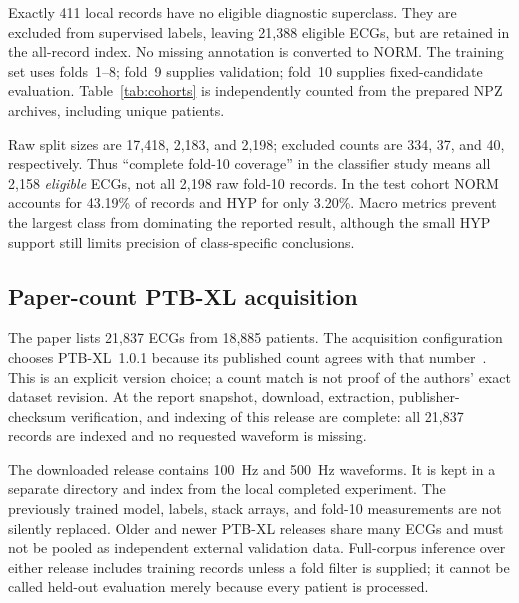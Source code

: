 \documentclass[11pt,a4paper]{article}
\begin{document}
Exactly 411 local records have no eligible diagnostic superclass. They are excluded from supervised labels, leaving 21,388 eligible ECGs, but are retained in the all-record index. No missing annotation is converted to NORM. The training set uses folds~1--8; fold~9 supplies validation; fold~10 supplies fixed-candidate evaluation. Table~\ref{tab:cohorts} is independently counted from the prepared NPZ archives, including unique patients.

\begin{table}[htbp]\centering\small

\caption{Prepared supervised cohorts. Counts are ECGs unless explicitly labeled patients. No patient or record overlaps between these three splits were found.}
\label{tab:cohorts}\end{table}

Raw split sizes are 17,418, 2,183, and 2,198; excluded counts are 334, 37, and 40, respectively. Thus ``complete fold-10 coverage'' in the classifier study means all 2,158 \emph{eligible} ECGs, not all 2,198 raw fold-10 records. In the test cohort NORM accounts for 43.19\% of records and HYP for only 3.20\%. Macro metrics prevent the largest class from dominating the reported result, although the small HYP support still limits precision of class-specific conclusions.

\subsection{Paper-count PTB-XL acquisition}
The paper lists 21,837 ECGs from 18,885 patients. The acquisition configuration chooses PTB-XL~1.0.1 because its published count agrees with that number~\cite{ptbxl_old}. This is an explicit version choice; a count match is not proof of the authors' exact dataset revision. At the report snapshot, download, extraction, publisher-checksum verification, and indexing of this release are complete: all 21,837 records are indexed and no requested waveform is missing.

The downloaded release contains 100~Hz and 500~Hz waveforms. It is kept in a separate directory and index from the local completed experiment. The previously trained model, labels, stack arrays, and fold-10 measurements are not silently replaced. Older and newer PTB-XL releases share many ECGs and must not be pooled as independent external validation data. Full-corpus inference over either release includes training records unless a fold filter is supplied; it cannot be called held-out evaluation merely because every patient is processed.
\end{document}
